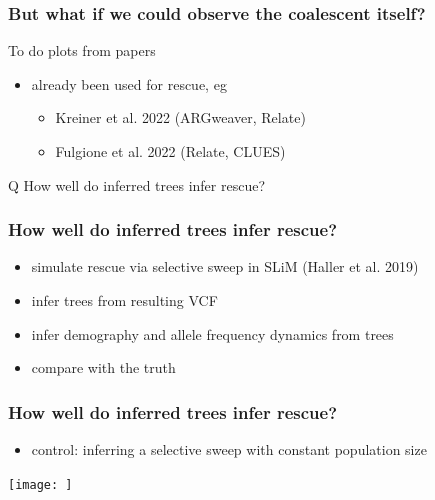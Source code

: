 \documentclass{beamer}
\begin{document}
\begin{frame}
	\frametitle{But what if we could observe the coalescent itself?}

	\begin{alertblock}{To do}
		plots from papers
	\end{alertblock}
	
	\begin{itemize}
		\item already been used for rescue, eg \pause
		\begin{itemize}
			\item Kreiner et al. 2022 (ARGweaver, Relate) \pause
			\item Fulgione et al. 2022 (Relate, CLUES) \pause
		\end{itemize}
	\end{itemize}
	
	\begin{block}{Q}
		How well do inferred trees infer rescue?
	\end{block}	
	
\end{frame}




\begin{frame}
	\frametitle{How well do inferred trees infer rescue?}
	
	\begin{itemize}
		\item simulate rescue via selective sweep in SLiM (Haller et al. 2019) \pause
		\item infer trees from resulting VCF \pause
		\item infer demography and allele frequency dynamics from trees \pause
		\item compare with the truth
	\end{itemize}

\end{frame}


\begin{frame}
	\frametitle{How well do inferred trees infer rescue?}
	
	\begin{itemize}
		\item control: inferring a selective sweep with constant population size \pause
	\end{itemize}

	\texttt{[image: ]}

\end{frame}
\end{document}
